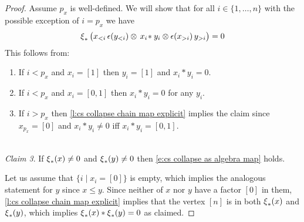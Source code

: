 \begin{proof}
	Assume $p_x$ is well-defined.
	We will show that for all $i \in \{1,\dots,n\}$ with the possible exception of $i = p_x$ we have
	\begin{equation} \label{e:case main lemma third claim}
	\operatorname{\xi}_\ast \big( x_{<i} \, \epsilon(y_{<i}) \otimes \, x_{i} \! \ast y_{i} \otimes \epsilon(x_{>i}) \, y_{>i} \big) = 0
	\end{equation}
	This follows from:
	\begin{enumerate}
		\item If $i < p_x$ and $x_i = [1]$ then $y_i = [1]$ and $x_i \ast y_i = 0$.
		\item If $i < p_x$ and $x_i = [0,1]$ then $x_i \ast y_i = 0$ for any $y_i$.
		\item If $i > p_x$ then \cref{l:cs collapse chain map explicit} implies the claim since $x_{p_x} = [0]$ and $x_i \ast y_i \neq 0$ iff $x_i \ast y_i = [0,1]$.
	\end{enumerate}

	\ \\ \noindent \textit{Claim 3}.
	If $\operatorname{\xi}_\ast(x) \neq 0$ and $\operatorname{\xi}_\ast(y) \neq 0$ then \eqref{e:cs collapse as algebra map} holds.

	Let us assume that $\big\{ i \mid x_i = [0] \big\}$ is empty, which implies the analogous statement for $y$ since $x \leq y$.
	Since neither of $x$ nor $y$ have a factor $[0]$ in them, \cref{l:cs collapse chain map explicit} implies that the vertex $[n]$ is in both $\operatorname{\xi}_\ast(x)$ and $\operatorname{\xi}_\ast(y)$, which implies $\operatorname{\xi}_\ast(x) \ast \operatorname{\xi}_\ast(y) = 0$ as claimed.


\end{proof}

